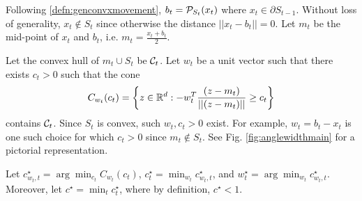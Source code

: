 Following \eqref{defn:genconvxmovement}, $b_t=\mathcal{P}_{S_t}(x_t)$ where $x_t\in \partial S_{t-1}$. Without loss of generality, 
 $x_t\notin S_{t}$ since otherwise the distance $||x_t-b_t||=0$.
 Let $m_t$ be the mid-point of $x_t$ and $b_t$, i.e. $m_t = \frac{x_t+b_t}{2}$.
 \begin{definition}\label{defn:anglewidth}
Let the convex hull of $m_t \cup S_{t}$ be $\mathcal{C}_t$.
 Let $w_t$ be a unit vector such that there exists $c_t>0$ such that the cone 
 $$C_{w_t}(c_t) = \left\{z\in {\mathbb{R}}^d: -w_t^T\frac{(z-m_t)}{||(z-m_t)||} \ge c_t\right\}$$ contains $\mathcal{C}_t$. Since $S_{t}$ is convex, such $w_t, c_t>0$ exist. For example, $w_t=b_t-x_t$ is one such choice for which $c_t>0$ since $m_t \notin S_t$.
See Fig. \ref{fig:anglewidthmain} for a pictorial representation.
 
 Let $c^\star_{w_t,t} = \arg \min_{c_t} C_{w_t}(c_t)$,
 $c^\star_t = \min_{w_t} c^\star_{w_t,t}$, and $w_t^\star= \arg \min_{w_t} c^\star_{w_t,t}$.
 Moreover, let $c^\star = \min_t  c^\star_t$, where by definition, $c^\star <1$. 
 \end{definition}
 
